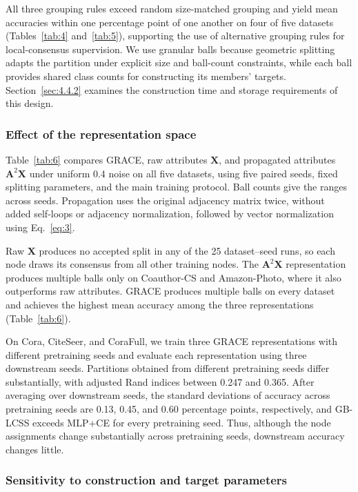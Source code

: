 \documentclass[times,review,10pt]{elsarticle}
\theoremstyle{definition}
\theoremstyle{plain}
\begin{document}
All three grouping rules exceed random size-matched grouping and yield mean accuracies within one percentage point of one another on four of five datasets (Tables~\ref{tab:4} and~\ref{tab:5}), supporting the use of alternative grouping rules for local-consensus supervision. We use granular balls because geometric splitting adapts the partition under explicit size and ball-count constraints, while each ball provides shared class counts for constructing its members' targets. Section~\ref{sec:4.4.2} examines the construction time and storage requirements of this design.

\subsubsection{Effect of the representation space}\label{sec:4.3.3}

Table~\ref{tab:6} compares GRACE, raw attributes \(\mathbf{X}\), and propagated attributes \(\mathbf{A}^2\mathbf{X}\) under uniform 0.4 noise on all five datasets, using five paired seeds, fixed splitting parameters, and the main training protocol. Ball counts give the ranges across seeds. Propagation uses the original adjacency matrix twice, without added self-loops or adjacency normalization, followed by vector normalization using Eq.~\eqref{eq:3}.



Raw \(\mathbf X\) produces no accepted split in any of the 25 dataset--seed runs, so each node draws its consensus from all other training nodes. The \(\mathbf A^2\mathbf X\) representation produces multiple balls only on Coauthor-CS and Amazon-Photo, where it also outperforms raw attributes. GRACE produces multiple balls on every dataset and achieves the highest mean accuracy among the three representations (Table~\ref{tab:6}).

On Cora, CiteSeer, and CoraFull, we train three GRACE representations with different pretraining seeds and evaluate each representation using three downstream seeds. Partitions obtained from different pretraining seeds differ substantially, with adjusted Rand indices \cite{ref74} between 0.247 and 0.365. After averaging over downstream seeds, the standard deviations of accuracy across pretraining seeds are 0.13, 0.45, and 0.60 percentage points, respectively, and GB-LCSS exceeds MLP+CE for every pretraining seed. Thus, although the node assignments change substantially across pretraining seeds, downstream accuracy changes little.

\subsubsection{Sensitivity to construction and target parameters}\label{sec:4.3.4}
\end{document}
